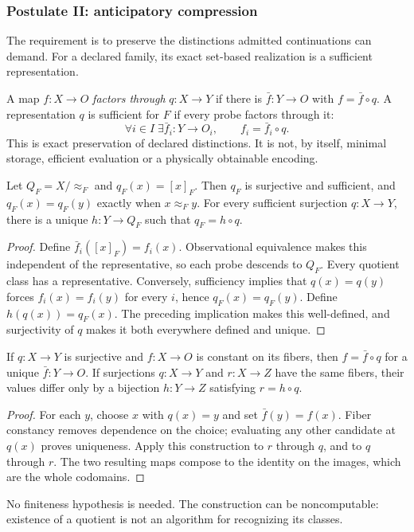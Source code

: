 \subsubsection{Postulate II: anticipatory compression}\label{ss:anticipatory-compression}\label{ss:relative-compression}

The requirement is to preserve the distinctions admitted continuations
can demand. For a declared family, its exact set-based realization is a
sufficient representation.

A map $f:X\to O$ \emph{factors through} $q:X\to Y$ if there is
$\bar f:Y\to O$ with $f=\bar f\circ q$. A representation $q$ is
sufficient for $F$ if every probe factors through it:
\begin{equation}
  \forall i\in I\;\exists\bar f_i:Y\to O_i,
  \qquad f_i=\bar f_i\circ q.\label{eq:sufficient}
\end{equation}
This is exact preservation of declared distinctions. It is not, by itself,
minimal storage, efficient evaluation or a physically obtainable encoding.

\begin{theorem}\label{thm:coarsest-quotient}
Let $Q_F=X/{\approx_F}$ and $q_F(x)=[x]_F$. Then $q_F$ is
surjective and sufficient, and $q_F(x)=q_F(y)$ exactly when
$x\approx_F y$. For every sufficient surjection $q:X\to Y$, there
is a unique $h:Y\to Q_F$ such that $q_F=h\circ q$.
\end{theorem}
\begin{proof}
Define $\bar f_i([x]_F)=f_i(x)$. Observational equivalence makes
this independent of the representative, so each probe descends to
$Q_F$. Every quotient class has a representative. Conversely,
sufficiency implies that $q(x)=q(y)$ forces $f_i(x)=f_i(y)$ for
every $i$, hence $q_F(x)=q_F(y)$. Define $h(q(x))=q_F(x)$.
The preceding implication makes this well-defined, and surjectivity
of $q$ makes it both everywhere defined and unique.
\end{proof}

\begin{theorem}\label{thm:unique-descent}
If $q:X\to Y$ is surjective and $f:X\to O$ is constant on its
fibers, then $f=\bar f\circ q$ for a unique $\bar f:Y\to O$.
If surjections $q:X\to Y$ and $r:X\to Z$ have the same fibers,
their values differ only by a bijection $h:Y\to Z$ satisfying
$r=h\circ q$.
\end{theorem}
\begin{proof}
For each $y$, choose $x$ with $q(x)=y$ and set $\bar f(y)=f(x)$.
Fiber constancy removes dependence on the choice; evaluating any
other candidate at $q(x)$ proves uniqueness. Apply this construction
to $r$ through $q$, and to $q$ through $r$. The two resulting maps
compose to the identity on the images, which are the whole codomains.
\end{proof}

No finiteness hypothesis is needed. The construction can be
noncomputable: existence of a quotient is not an algorithm for
recognizing its classes.
